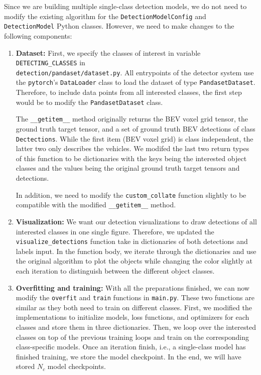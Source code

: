 \documentclass[letter]{article}
\begin{document}
	Since we are building multiple single-class detection models, we do not need to modify the existing algorithm for the \verb|DetectionModelConfig| and \verb|DetectionModel| Python classes. However, we need to make changes to the following components: \begin{enumerate}
		\item \textbf{Dataset:} First, we specify the classes of interest in variable \verb|DETECTING_CLASSES| in \\
		\verb|detection/pandaset/dataset.py|. All entrypoints of the detector system use the \verb|pytorch|'s \verb|DataLoader| class to load the dataset of type \verb|PandasetDataset|. Therefore, to include data points from all interested classes, the first step would be to modify the \verb|PandasetDataset| class. 
		
		The \verb|__getitem__| method originally returns the BEV voxel grid tensor, the ground truth target tensor, and a set of ground truth BEV detections of class \verb|Dectections|. While the first item (BEV voxel grid) is class independent, the latter two only describes the vehicles. We modifed the last two return types of this function to be dictionaries with the keys being the interested object classes and the values being the original ground truth target tensors and detections. 

		In addition, we need to modify the \verb|custom_collate| function slightly to be compatible with the modified \verb|__getitem__| method. 

		\item \textbf{Visualization:} We want our detection visualizations to draw detections of all interested classes in one single figure. Therefore, we updated the \verb|visualize_detections| function take in dictionaries of both detections and labels input. In the function body, we iterate through the dictionaries and use the original algorithm to plot the objects while changing the color slightly at each iteration to distinguish between the different object classes. 
		
		\item \textbf{Overfitting and training:} With all the preparations finished, we can now modify the \verb|overfit| and \verb|train| functions in \verb|main.py|. These two functions are similar as they both need to train on different classes. First, we modified the implementations to initialize models, loss functions, and optimizers for each classes and store them in three dictionaries. Then, we loop over the interested classes on top of the previous training loops and train on the corresponding class-specific models. Once an iteration finish, i.e., a single-class model has finished training, we store the model checkpoint. In the end, we will have stored $ N_c $ model checkpoints. 
		

\end{enumerate}
\end{document}
